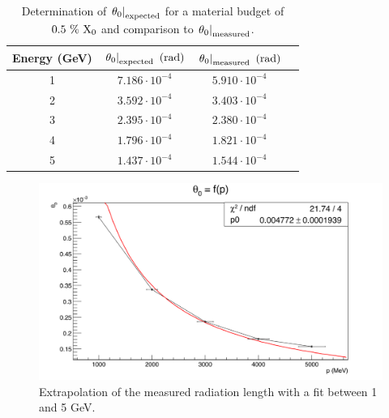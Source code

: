    \begin{table}
     \centering
     \begin{tabular}{c c c c}
        \hline %
        Energy (GeV)	& $\left. \theta_0\right|_{\rm{expected}}~(\rm{rad})$ & $\left. \theta_0\right|_{\rm{measured}}~(\rm{rad})$ \tabularnewline
        \hline %
        \hline %

        	1	  &		$7.186\cdot 10^{-4}$	  &		$5.910\cdot 10^{-4}$	    \tabularnewline
        	2		&		$3.592\cdot 10^{-4}$	  &		$3.403\cdot 10^{-4}$	     \tabularnewline
        	3		&		$2.395\cdot 10^{-4}$	  &		$2.380\cdot 10^{-4}$      \tabularnewline
        	4		&		$1.796\cdot 10^{-4}$	  &	  $1.821\cdot 10^{-4}$       \tabularnewline
        	5		&		$1.437\cdot 10^{-4}$    &		$1.544\cdot 10^{-4}$	     \tabularnewline
     
     \end{tabular}
     \caption{Determination of $\left. \theta_0\right|_{\rm{expected}}$ for a material budget of $0.5~\%~\rm{X_0}$ and comparison to $\left. \theta_0\right|_{\rm{measured}}$.}
     \label{tab:theta0Calcultation}
   \end{table}

   \begin{figure}[!h]
     \centering
     \includegraphics[width = \textwidth]{Pictures/X0/theta0VsP_all.png}
     \caption{Extrapolation of the measured radiation length with a fit between 1 and 5 GeV.}
     \label{fig:theta0vsP_all}
   \end{figure}


